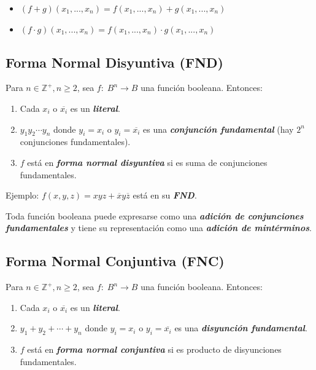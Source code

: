 \documentclass[11pt,a4paper]{article}   %
\begin{document}
\begin{itemize}
\item $(f+g)(x_1, ..., x_n) = f(x_1, ..., x_n) + g(x_1, ..., x_n)$
\item $(f\cdot g)(x_1, ..., x_n) = f(x_1, ..., x_n) \cdot g(x_1, ..., x_n)$
\end{itemize}

\subsection{Forma Normal Disyuntiva (FND)}
Para $n \in \mathbb{Z}^+, n\geqslant 2$, sea $f:\; B^n \to B$ una función booleana. Entonces:

\begin{enumerate}
    \item Cada $x_i$ o $\overline{x_i}$ es un \textit{\textbf{literal}}.
    \item $y_1y_2 \cdots y_n$ donde $y_i = x_i$ o $y_i = \overline{x_i}$ es una \textit{\textbf{conjunción fundamental}} (hay $2^n$ conjunciones fundamentales).
    \item $f$ está en \textit{\textbf{forma normal disyuntiva}} si es suma de conjunciones fundamentales.
\end{enumerate}

Ejemplo: $f(x,y,z) = xyz + \overline{x}y\overline{z}$ está en su \textit{\textbf{FND}}.

\begin{tcolorbox}[colback=yellow!5!white,colframe=yellow!75!black,title=Tipos de recurrencias]
Toda función booleana puede expresarse como una \textit{\textbf{adición de conjunciones fundamentales}}
y tiene su representación como una \textit{\textbf{adición de mintérminos}}.
\end{tcolorbox}


\subsection{Forma Normal Conjuntiva (FNC)}
Para $n \in \mathbb{Z}^+, n\geqslant 2$, sea $f:\; B^n \to B$ una función booleana. Entonces:

\begin{enumerate}
    \item Cada $x_i$ o $\overline{x_i}$ es un \textit{\textbf{literal}}.
    \item $y_1 + y_2 + \cdots + y_n$ donde $y_i = x_i$ o $y_i = \overline{x_i}$ es una \textit{\textbf{disyunción fundamental}}.
    \item $f$ está en \textit{\textbf{forma normal conjuntiva}} si es producto de disyunciones fundamentales.
\end{enumerate}
\end{document}
